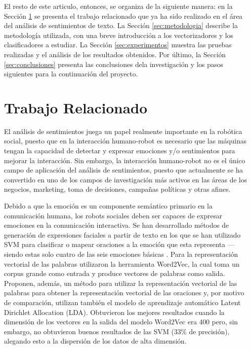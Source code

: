 \documentclass[conference]{IEEEtran}
\begin{document}
    El resto de este articulo, entonces, se organiza de la siguiente manera: en la Sección \ref{sec:antecedentes} se presenta el trabajo relacionado que ya ha sido realizado en el área del análisis de sentimientos de texto. La Sección \ref{sec:metodologia} describe la metodología utilizada, con una breve introducción a los vectorizadores y los clasificadores a estudiar. La Sección \ref{sec:experimentos} muestra las pruebas realizadas y el análisis de los resultados obtenidos. Por último, la Sección \ref{sec:conclusiones} presenta las conclusiones dela investigación y los pasos siguientes para la continuación del proyecto.




\section{Trabajo Relacionado} \label{sec:antecedentes}

    El análisis de sentimientos juega un papel realmente importante en la robótica social, puesto que en la interacción humano-robot es necesario que las máquinas tengan la capacidad de detectar y expresar emociones y/o sentimientos para mejorar la interacción. Sin embargo, la interacción humano-robot no es el único campo de aplicación del análisis de sentimientos, puesto que actualmente se ha convertido en uno de los campos de investigación más activos en las áreas de los negocios, marketing, toma de decisiones, campañas políticas y otras afines\cite{alzahrani2018development}.
    
    Debido a que la emoción es un componente semántico primario en la comunicación humana, los robots sociales deben ser capaces de expresar emociones en la comunicación interactiva. Se han desarrollado métodos de generación de expresiones faciales a partir de texto en los que se han utilizado SVM para clasificar o mapear oraciones a la emoción que esta representa \cite{bai2014asentiment} --- siendo estas solo cuatro de las seis emociones básicas \cite{scherer1979nonlinguistic}. Para la representación vectorial de las palabras utilizaron la herramienta Word2Vec, la cual toma un corpus grande como entrada y produce vectores de palabras como salida. Proponen, además, un método para utilizar la representación vectorial de las palabras para obtener la representación vectorial de las oraciones y, por motivo de comparación, utilizan también el modelo de aprendizaje automático Latent Dirichlet Allocation (LDA). Obtuvieron los mejores resultados cuando la dimensión de los vectores en la salida del modelo Word2Vec era 400 pero, sin embargo, no obtuvieron buenos resultados de las SVM (33\% de precisión), alegando esto a la dispersión de los datos de alta dimensión.
    
\end{document}
